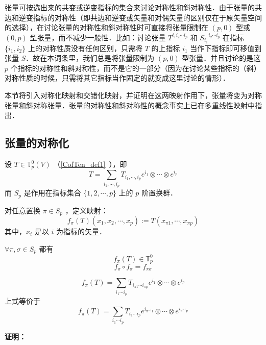 


张量可按选出来的共变或逆变指标的集合来讨论对称性和斜对称性．由于张量的共边和逆变指标的对称性（即共边和逆变或矢量和对偶矢量的区别仅在于原矢量空间的选择），在讨论张量的对称性和斜对称性时可直接将张量限制在 $(p,0)$ 型或 $(0,p)$ 型张量，而不减少一般性．比如：讨论张量 $T^{i_1 i_2\cdots i_p}$ 和 ${S_{i_1}}^{i_2\cdots i_p}$ 在指标 $\{i_1,i_2\}$ 上的对称性质没有任何区别，只需将 $T$ 的上指标 $i_1$ 当作下指标即可移值到张量 $S$．故在本词条里，我们总是将张量限制为 $(p,0)$ 型张量．并且讨论的是这 $p$ 个指标的对称性和斜对称性，而不是它的一部分（因为在讨论某些指标的（斜）对称性质的时候，只需将其它指标当作固定的就变成这里讨论的情形）．

本节将引入对称化映射和交错化映射，并证明在这两映射作用下，张量将变为对称张量和斜对称张量．张量的对称性和斜对称性的概念事实上已在多重线性映射中指出．
\subsection{张量的对称化}
设 $T\in \mathbb{T}_p^0(V)$ （\autoref{CofTen_def1}~），即
\begin{equation}
T=\sum_{i_1,\cdots,i_p}T_{i_1,\cdots,i_p}e^{i_1}\otimes\cdots\otimes e^{i_p}
\end{equation}
而 $S_p$ 是作用在指标集合 $\{1,2,\cdots,p\}$ 上的 $p$ 阶置换群．

对任意置换 $\pi\in S_p$ ，定义映射：
\begin{equation}\label{SIofTe_eq1}
f_\pi(T)(x_1,x_2,\cdots,x_p):=T(x_{\pi1},\cdots,x_{\pi p})
\end{equation}
其中，$x_i$ 是以 $i$ 为指标的矢量．

\begin{theorem}{}
$\forall \pi,\sigma\in S_p$ 都有 
\begin{equation}
f_{\pi}(T)\in\mathbb{T}_p^0
\end{equation}
\begin{equation}\label{SIofTe_eq6}
f_\pi \circ f_\sigma=f_{\pi\sigma}
\end{equation}

\begin{equation}\label{SIofTe_eq2}
f_{\pi}(T)=\sum_{i_1\cdots i_p}T_{i_{\pi1}\cdots i_{\pi p}}e^{i_1}\otimes\cdots\otimes e^{i_p}
\end{equation}
上式等价于
\begin{equation}\label{SIofTe_eq3}
f_{\pi}(T)=\sum_{i_1\cdots i_p}T_{i_1\cdots i_p}e^{i_{\pi^{-1}1}}\otimes\cdots\otimes e^{i_{\pi^{-1}p}}
\end{equation}
\end{theorem}
\textbf{证明：}


